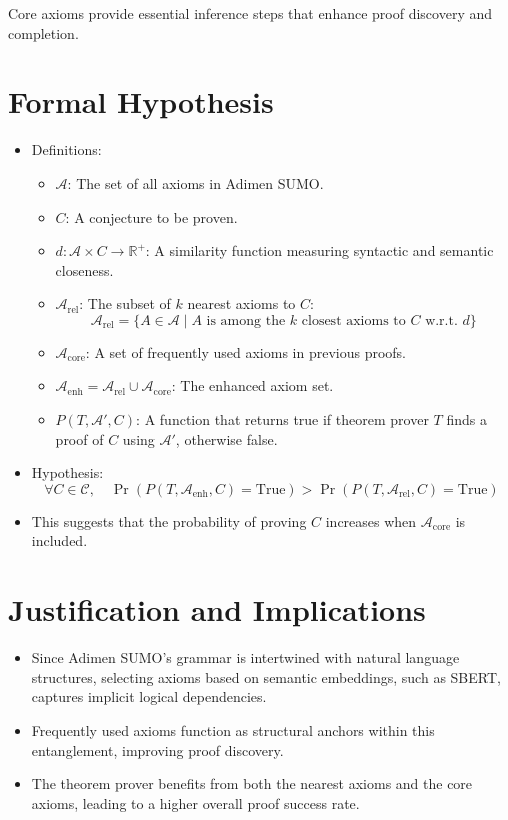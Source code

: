 \documentclass[english,version-2020-11]{uzl-thesis}
\begin{document}
Core axioms provide essential inference steps that enhance proof discovery and completion.

\section{Formal Hypothesis}
\begin{itemize}
    \item Definitions:
    \begin{itemize}
        \item \( \mathcal{A} \): The set of all axioms in Adimen SUMO.
        \item \( C \): A conjecture to be proven.
        \item \( d: \mathcal{A} \times C \to \mathbb{R}^+ \): A similarity function measuring syntactic and semantic closeness.
        \item \( \mathcal{A}_{\text{rel}} \): The subset of \( k \) nearest axioms to \( C \):
        \begin{equation}
            \mathcal{A}_{\text{rel}} = \{ A \in \mathcal{A} \mid A \text{ is among the } k \text{ closest axioms to } C \text{ w.r.t. } d \}
        \end{equation}
        \item \( \mathcal{A}_{\text{core}} \): A set of frequently used axioms in previous proofs.
        \item \( \mathcal{A}_{\text{enh}} = \mathcal{A}_{\text{rel}} \cup \mathcal{A}_{\text{core}} \): The enhanced axiom set.
        \item \( P(T, \mathcal{A}', C) \): A function that returns true if theorem prover \( T \) finds a proof of \( C \) using \( \mathcal{A}' \), otherwise false.
    \end{itemize}
    \item Hypothesis:
    \begin{equation}
        \forall C \in \mathcal{C}, \quad \Pr(P(T, \mathcal{A}_{\text{enh}}, C) = \text{True}) > \Pr(P(T, \mathcal{A}_{\text{rel}}, C) = \text{True})
    \end{equation}
    \item This suggests that the probability of proving \( C \) increases when \( \mathcal{A}_{\text{core}} \) is included.
\end{itemize}

\section{Justification and Implications}
\begin{itemize}
    \item Since Adimen SUMO’s grammar is intertwined with natural language structures, selecting axioms based on semantic embeddings, such as SBERT, captures implicit logical dependencies.
    \item Frequently used axioms function as structural anchors within this entanglement, improving proof discovery.
    \item The theorem prover benefits from both the nearest axioms and the core axioms, leading to a higher overall proof success rate.
\end{itemize}
\end{document}

